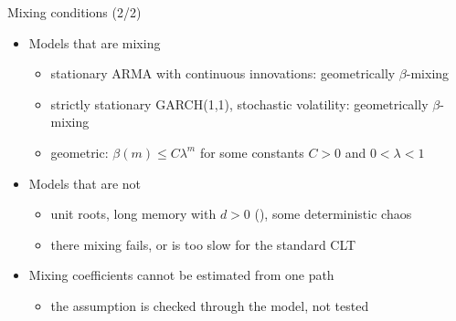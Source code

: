 \begin{frame}{Mixing conditions (2/2)}
\itemsize{\small}
\begin{itemize}
    \item Models that are mixing
    \begin{itemize}
        \item stationary ARMA with continuous innovations: geometrically $\beta$-mixing 
        \item strictly stationary GARCH(1,1), stochastic volatility: geometrically $\beta$-mixing 
        \item geometric: $\beta(m) \le C\lambda^m$ for some constants $C > 0$ and $0 < \lambda < 1$
    \end{itemize}
    \item Models that are not
    \begin{itemize}
        \item unit roots, long memory with $d > 0$ (), some deterministic chaos
        \item there mixing fails, or is too slow for the standard CLT
    \end{itemize}
    \item Mixing coefficients cannot be estimated from one path
    \begin{itemize}
        \item the assumption is checked through the model, not tested
    \end{itemize}
\end{itemize}
\end{frame}

